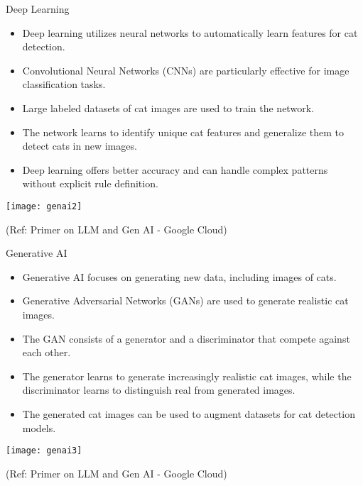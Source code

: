 \begin{frame}[fragile]{Deep Learning}
  \begin{itemize}
    \item Deep learning utilizes neural networks to automatically learn features for cat detection.
    \item Convolutional Neural Networks (CNNs) are particularly effective for image classification tasks.
    \item Large labeled datasets of cat images are used to train the network.
    \item The network learns to identify unique cat features and generalize them to detect cats in new images.
    \item Deep learning offers better accuracy and can handle complex patterns without explicit rule definition.
  \end{itemize}
  
\begin{center}
\texttt{[image: genai2]}
\end{center}

{\tiny (Ref: Primer on LLM and Gen AI - Google Cloud)}  
\end{frame}

\begin{frame}[fragile]{Generative AI}
  \begin{itemize}
    \item Generative AI focuses on generating new data, including images of cats.
    \item Generative Adversarial Networks (GANs) are used to generate realistic cat images.
    \item The GAN consists of a generator and a discriminator that compete against each other.
    \item The generator learns to generate increasingly realistic cat images, while the discriminator learns to distinguish real from generated images.
    \item The generated cat images can be used to augment datasets for cat detection models.
  \end{itemize}
  
\begin{center}
\texttt{[image: genai3]}
\end{center}

{\tiny (Ref: Primer on LLM and Gen AI - Google Cloud)}
  
\end{frame}

